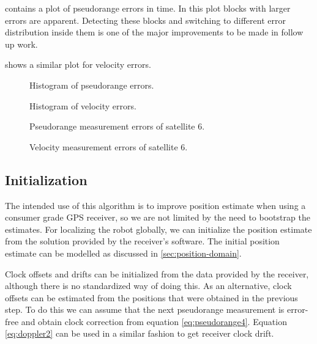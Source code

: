 contains a plot of pseudorange errors in time.
In this plot blocks with larger errors are apparent.
Detecting these blocks and switching to different error distribution inside them
is one of the major improvements to be made in follow up work.

 shows a similar plot for velocity errors.

\begin{figure}[p]
	\centering
	\noindent{}
	\caption{Histogram of pseudorange errors.}
	\label{fig:pseudorange-hist}
\end{figure}

\begin{figure}[p]
	\centering
	\noindent{}
	\caption{Histogram of velocity errors.}
	\label{fig:velocity-hist}
\end{figure}

\begin{figure}[p]
	\centering
	\noindent{}
	\caption{Pseudorange measurement errors of satellite 6.}
	\label{fig:pseudorange-errors}
\end{figure}

\begin{figure}[p]
	\centering
	\noindent{}
	\caption{Velocity measurement errors of satellite 6.}
	\label{fig:velocity-errors}
\end{figure}


\subsection{Initialization}
The intended use of this algorithm is to improve position estimate when using
a consumer grade GPS receiver, so we are not limited by the need to bootstrap the estimates.
For localizing the robot globally, we can initialize the position
estimate from the solution provided by the receiver's software.
The initial position estimate can be modelled as discussed in \cref{sec:position-domain}.

Clock offsets and drifts can be initialized from the data provided by the
receiver, although there is no standardized way of doing this.
As an alternative, clock offsets can be estimated from the positions that were obtained in
the previous step.
To do this we can assume that the next pseudorange measurement is error-free
and obtain clock correction from equation \eqref{eq:pseudorange4}.
Equation \eqref{eq:doppler2} can be used in a similar fashion to get receiver clock drift.

